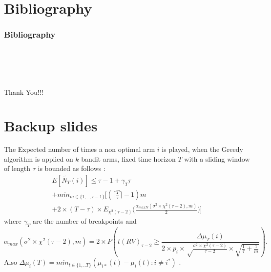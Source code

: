 \documentclass[compress, serif, onlymath, professionalfonts]{beamer}
\begin{document}
\section{Bibliography}
\begin{frame}[t,allowframebreaks]
\frametitle{Bibliography}

\end{frame}

\section{~}
\begin{frame}
\begin{center}
\Huge
Thank You!!!
\end{center}
\end{frame}
\section*{Backup slides}
\begin{frame}

\begin{footnotesize}


\begin{theorem}
The Expected number of times a non optimal arm $i$ is played, when the Greedy algorithm is applied on $k$ bandit arms, fixed time horizon $T$ with a sliding window of length $\tau$ is bounded as follows :
\begin{multline*}E[\tilde{N_T}(i)] \leq \tau-1+\gamma_T\tau\\
+min_{m \in \{1,..,\tau-1\}}\big[( \lceil{\frac{T}{\tau}}\rceil-1)m\\
+2\times(T-\tau)\times E_{\chi^2(\tau-2)}\big(\frac{\alpha_{maxN}(\sigma^2\times\chi^2(\tau-2),m)}{2}\big)\big]
\end{multline*}
where $\gamma_T$ are the number of breakpoints and $$\alpha_{max}(\sigma^2\times\chi^2(\tau-2),m)= 2\times P(t(RV)_{\tau-2} \geq \frac{\Delta\mu_T(i)}{2\times p_i \times \sqrt\frac{\sigma^2\times\chi^2(\tau-2)}{\tau-2} \times \sqrt{\frac{1}{\tau}+\frac{1}{m}}}  ).$$ Also $\Delta \mu_i(T)=min_{t \in \{1,..T\}}(\mu_{i*}(t)-\mu_i(t):i \neq i^*)$ .
\end{theorem}
\end{footnotesize}
\end{frame}
\end{document}
